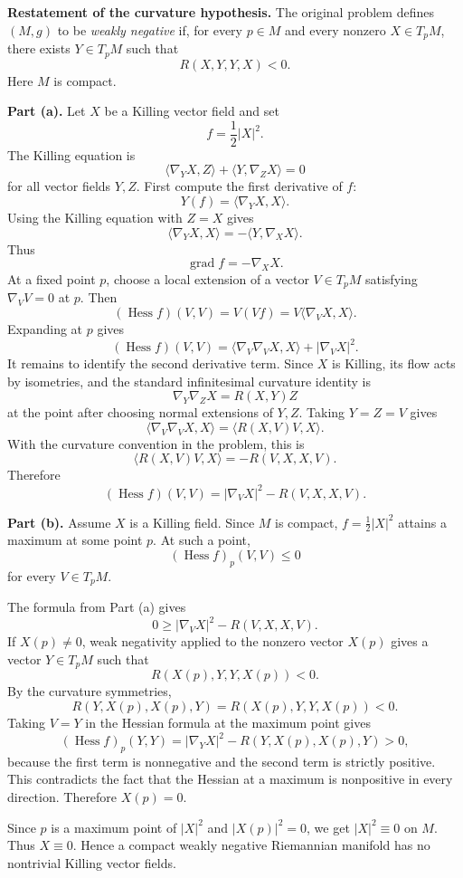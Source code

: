 \begin{solution}
\textbf{Restatement of the curvature hypothesis.}
The original problem defines $(M,g)$ to be \textit{weakly negative} if, for every
$p\in M$ and every nonzero $X\in T_pM$, there exists $Y\in T_pM$ such that
\[
    R(X,Y,Y,X)<0.
\]
Here $M$ is compact.

\textbf{Part (a).}
Let $X$ be a Killing vector field and set
\[
    f=\frac12 |X|^2.
\]
The Killing equation is
\[
    \langle\nabla_YX,Z\rangle+\langle Y,\nabla_ZX\rangle=0
\]
for all vector fields $Y,Z$. First compute the first derivative of $f$:
\[
    Y(f)=\langle\nabla_YX,X\rangle.
\]
Using the Killing equation with $Z=X$ gives
\[
    \langle\nabla_YX,X\rangle
    =
    -\langle Y,\nabla_XX\rangle.
\]
Thus
\[
    \operatorname{grad} f=-\nabla_XX.
\]
At a fixed point $p$, choose a local extension of a vector $V\in T_pM$ satisfying
$\nabla_VV=0$ at $p$. Then
\[
    (\operatorname{Hess}f)(V,V)
    =
    V(Vf)
    =
    V\langle\nabla_VX,X\rangle.
\]
Expanding at $p$ gives
\[
    (\operatorname{Hess}f)(V,V)
    =
    \langle\nabla_V\nabla_VX,X\rangle+|\nabla_VX|^2.
\]
It remains to identify the second derivative term. Since $X$ is Killing, its flow
acts by isometries, and the standard infinitesimal curvature identity is
\[
    \nabla_Y\nabla_ZX=R(X,Y)Z
\]
at the point after choosing normal extensions of $Y,Z$. Taking $Y=Z=V$ gives
\[
    \langle\nabla_V\nabla_VX,X\rangle
    =
    \langle R(X,V)V,X\rangle.
\]
With the curvature convention in the problem, this is
\[
    \langle R(X,V)V,X\rangle=-R(V,X,X,V).
\]
Therefore
\[
    (\operatorname{Hess}f)(V,V)
    =
    |\nabla_VX|^2-R(V,X,X,V).
\]

\textbf{Part (b).}
Assume $X$ is a Killing field. Since $M$ is compact, $f=\frac12|X|^2$ attains a
maximum at some point $p$. At such a point,
\[
    (\operatorname{Hess}f)_p(V,V)\leq 0
\]
for every $V\in T_pM$.

The formula from Part (a) gives
\[
    0
    \geq
    |\nabla_VX|^2-R(V,X,X,V).
\]
If $X(p)\neq 0$, weak negativity applied to the nonzero vector $X(p)$ gives a
vector $Y\in T_pM$ such that
\[
    R(X(p),Y,Y,X(p))<0.
\]
By the curvature symmetries,
\[
    R(Y,X(p),X(p),Y)=R(X(p),Y,Y,X(p))<0.
\]
Taking $V=Y$ in the Hessian formula at the maximum point gives
\[
    (\operatorname{Hess}f)_p(Y,Y)
    =
    |\nabla_YX|^2-R(Y,X(p),X(p),Y)>0,
\]
because the first term is nonnegative and the second term is strictly positive.
This contradicts the fact that the Hessian at a maximum is nonpositive in every
direction. Therefore $X(p)=0$.

Since $p$ is a maximum point of $|X|^2$ and $|X(p)|^2=0$, we get
$|X|^2\equiv 0$ on $M$. Thus $X\equiv 0$. Hence a compact weakly negative
Riemannian manifold has no nontrivial Killing vector fields.
\end{solution}
